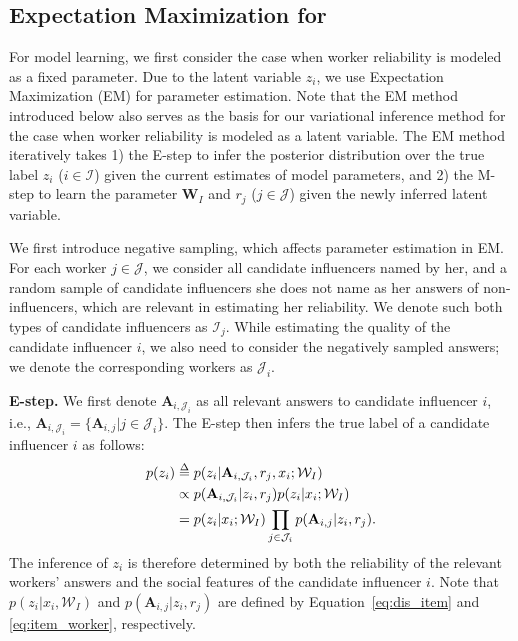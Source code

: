 \subsection{Expectation Maximization for \sys} 
\label{sec:em}
For model learning, we first consider the case when worker reliability is modeled as a fixed parameter. Due to the latent variable $z_i$, we use Expectation Maximization (EM) \cite{dempster1977maximum} for parameter estimation. Note that the EM method introduced below also serves as the basis for our variational inference method for the case when worker reliability is modeled as a latent variable. The EM method iteratively takes 1) the E-step to infer the posterior distribution over the true label $z_i$ ($i\in \mathcal{I}$) given the current estimates of model parameters, and 2) the M-step to learn the parameter $\mathbf{W}_I$ and $r_j$ ($j\in \mathcal{J}$) given the newly inferred latent variable.

We first introduce negative sampling, which affects parameter estimation in EM. For each worker $j\in \mathcal{J}$, we consider all candidate influencers named by her, and a random sample of candidate influencers she does not name as her answers of non-influencers, which are relevant in estimating her reliability. We denote such both types of candidate influencers as $\mathcal{I}_j$. While estimating the quality of the candidate influencer $i$, we also need to consider the negatively sampled answers; we denote the corresponding workers as $\mathcal{J}_i$. 

\smallskip
\noindent\textbf{E-step.} We first denote $\mathbf{A}_{i,\mathcal{J}_i}$ as all relevant answers to candidate influencer $i$, i.e., $\mathbf{A}_{i,\mathcal{J}_i} = \{\mathbf{A}_{i,j}|j \in \mathcal{J}_i\}$. The E-step then infers the true label of a candidate influencer $i$ as follows:
%
\begin{align}
    p(z_i) & \delequal p(z_i|\mathbf{A}_{i,\mathcal{J}_i},r_{j},x_i;\mathcal{W}_I) \nonumber\\
        &\propto p(\mathbf{A}_{i,\mathcal{J}_i}|z_i,r_j) p(z_i|x_i;\mathcal{W}_I) \label{eq:dist_cond}\\
        &=p(z_i|x_i;\mathcal{W}_I) \prod_{j \in \mathcal{J}_i} p(\mathbf{A}_{i,j}|z_i,r_{j}). \nonumber    
\end{align}
%
The inference of $z_i$ is therefore determined by both the reliability of the relevant workers' answers and the social features of the candidate influencer $i$. Note that $p(z_i|x_i,\mathcal{W}_I)$ and $p(\mathbf{A}_{i,j}|z_i,r_{j})$ are defined by Equation~\ref{eq:dis_item} and \ref{eq:item_worker}, respectively.

